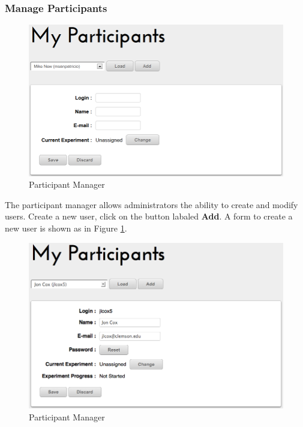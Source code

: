 \documentclass[article]{ij4uq}              %
\begin{document}
\subsubsection {Manage Participants}

\begin{figure}[h!]
 \centering
 \includegraphics[width=5.0in]{figures/manage_participants_new.png}
 \caption{Participant Manager}
 \label{fig:managePartNew}
\end{figure}
\FloatBarrier

The participant manager allows administrators the ability to create and modify users.  Create a new user, click on the button labaled \textbf{Add}.  A form to create a new user is shown as in Figure \ref{fig:managePartNew}.

\begin{figure}[h!]
 \centering
 \includegraphics[width=5.0in]{figures/manage_participants.png}
 \caption{Participant Manager}
 \label{fig:managePart}
\end{figure}
\FloatBarrier
\end{document}
